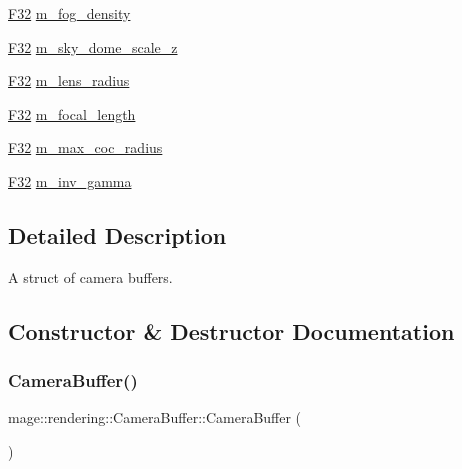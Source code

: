 \begin{DoxyCompactItemize}
\item 
\hyperlink{namespacemage_aa97e833b45f06d60a0a9c4fc22ae02c0}{F32} \hyperlink{structmage_1_1rendering_1_1_camera_buffer_aa9c3a305adfbeb717d480e822ed1c77e}{m\+\_\+fog\+\_\+density}
\item 
\hyperlink{namespacemage_aa97e833b45f06d60a0a9c4fc22ae02c0}{F32} \hyperlink{structmage_1_1rendering_1_1_camera_buffer_abfb4dbb9a228b6a7412b09b179fd157d}{m\+\_\+sky\+\_\+dome\+\_\+scale\+\_\+z}
\item 
\hyperlink{namespacemage_aa97e833b45f06d60a0a9c4fc22ae02c0}{F32} \hyperlink{structmage_1_1rendering_1_1_camera_buffer_a7915bec843e03ad2248c08b10317ccc7}{m\+\_\+lens\+\_\+radius}
\item 
\hyperlink{namespacemage_aa97e833b45f06d60a0a9c4fc22ae02c0}{F32} \hyperlink{structmage_1_1rendering_1_1_camera_buffer_a7ed5079582d476597f8bc4d6a0b3f372}{m\+\_\+focal\+\_\+length}
\item 
\hyperlink{namespacemage_aa97e833b45f06d60a0a9c4fc22ae02c0}{F32} \hyperlink{structmage_1_1rendering_1_1_camera_buffer_a3273510e0a7bbdd9481fe67f9e223f59}{m\+\_\+max\+\_\+coc\+\_\+radius}
\item 
\hyperlink{namespacemage_aa97e833b45f06d60a0a9c4fc22ae02c0}{F32} \hyperlink{structmage_1_1rendering_1_1_camera_buffer_a0ff45fc9f243d43fa43952b026900ade}{m\+\_\+inv\+\_\+gamma}
\end{DoxyCompactItemize}


\subsection{Detailed Description}
A struct of camera buffers. 

\subsection{Constructor \& Destructor Documentation}
\hypertarget{structmage_1_1rendering_1_1_camera_buffer_a751c2923a5deb710d7c3957f04c89fcf}{}\label{structmage_1_1rendering_1_1_camera_buffer_a751c2923a5deb710d7c3957f04c89fcf} 
\subsubsection{\texorpdfstring{Camera\+Buffer()}{CameraBuffer()}\hspace{0.1cm}{\footnotesize\ttfamily [1/3]}}
{\footnotesize\ttfamily mage\+::rendering\+::\+Camera\+Buffer\+::\+Camera\+Buffer (\begin{DoxyParamCaption}{ }\end{DoxyParamCaption})\hspace{0.3cm}{\ttfamily [noexcept]}}

